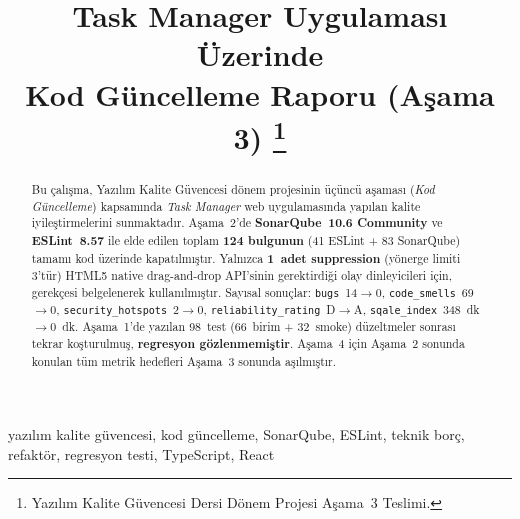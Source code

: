 \documentclass[conference]{IEEEtran}
\begin{document}
\title{Task Manager Uygulaması Üzerinde\\
Kod Güncelleme Raporu (Aşama 3)%
\thanks{Yazılım Kalite Güvencesi Dersi Dönem Projesi Aşama~3 Teslimi.}}

\author{%
\and
{}
\and
{}
\and
{}
}

\maketitle

\begin{abstract}
Bu çalışma, Yazılım Kalite Güvencesi dönem projesinin üçüncü
aşaması (\emph{Kod Güncelleme}) kapsamında \emph{Task Manager} web
uygulamasında yapılan kalite iyileştirmelerini sunmaktadır. Aşama~2'de
\textbf{SonarQube~10.6 Community} ve \textbf{ESLint~8.57} ile elde edilen
toplam \textbf{124 bulgunun} (41 ESLint + 83 SonarQube) tamamı kod üzerinde
kapatılmıştır. Yalnızca \textbf{1~adet suppression} (yönerge limiti
3'tür) HTML5 native drag-and-drop API'sinin gerektirdiği olay dinleyicileri
için, gerekçesi belgelenerek kullanılmıştır. Sayısal sonuçlar:
\texttt{bugs}~14$\to$0, \texttt{code\_smells}~69$\to$0,
\texttt{security\_hotspots}~2$\to$0,
\texttt{reliability\_rating}~D$\to$A,
\texttt{sqale\_index}~348~dk$\to$0~dk. Aşama~1'de yazılan 98~test
(66~birim + 32~smoke) düzeltmeler sonrası tekrar koşturulmuş,
\textbf{regresyon gözlenmemiştir}. Aşama~4 için Aşama~2 sonunda konulan
tüm metrik hedefleri Aşama~3 sonunda aşılmıştır.
\end{abstract}

\begin{IEEEkeywords}
yazılım kalite güvencesi, kod güncelleme, SonarQube, ESLint, teknik borç,
refaktör, regresyon testi, TypeScript, React
\end{IEEEkeywords}
\end{document}
